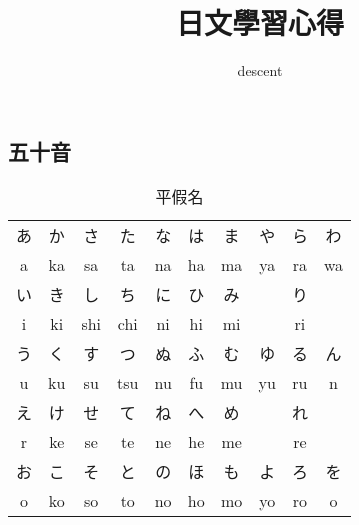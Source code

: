 \documentclass[12pt]{article}
\begin{document}
\begin{CJK}{UTF8}{cybercjk}
\title{日文學習心得}
\author{descent}
\maketitle
\newpage

\renewcommand{\contentsname}{目錄}
\renewcommand{\tablename}{表}
\renewcommand{\figurename}{圖}
\renewcommand{\listtablename}{表格目錄}
\renewcommand{\listfigurename}{圖目錄}

\tableofcontents
\newpage


\section{五十音}

\begin{table}[htdp]
\caption{平假名}
\begin{tabular}{cccccccccc}
\hline
あ& か & さ & た & な & は & ま & や & ら & わ\\
a & ka & sa & ta & na & ha & ma& ya & ra & wa\\
\hline
い & き & し & ち & に & ひ & み & & り& \\
i & ki & shi & chi & ni & hi & mi & & ri& \\
\hline
う & く  & す & つ & ぬ & ふ & む & ゆ & る & ん\\	
 u & ku &  su &  tsu &  nu &  fu &  mu &  yu &  ru & n\\	
\hline
え & け & せ & て & ね & へ & め & & れ & \\	
 r & ke &  se &  te &  ne &  he &  me & &  re & \\	
\hline
お & こ  & そ & と & の & ほ & も & よ & ろ & を\\	
 o &  ko &  so &  to &  no &  ho &  mo &  yo &  ro & o\\	

\hline
\end{tabular}
\end{table}



\end{CJK}
\end{document}
